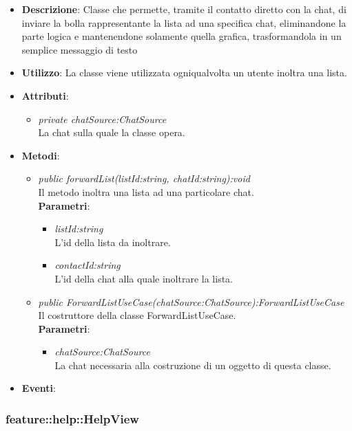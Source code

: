 \begin{itemize}
\item \textbf{Descrizione}: Classe che permette, tramite il contatto diretto con la chat, di inviare la bolla rappresentante la lista ad una specifica chat, eliminandone la parte logica e mantenendone solamente quella grafica, trasformandola in un semplice messaggio di testo
\item \textbf{Utilizzo}: La classe viene utilizzata ogniqualvolta un utente inoltra una lista.
\item \textbf{Attributi}: 
	\begin{itemize}
	\item \textit{private chatSource:ChatSource}\\
	La chat sulla quale la classe opera.
	\end{itemize}
\item \textbf{Metodi}:
	\begin{itemize}
	\item \textit{public forwardList(listId:string, chatId:string):void}\\
	Il metodo inoltra una lista ad una particolare chat.
			\\ \textbf{Parametri}: \begin{itemize}
			\item \textit{listId:string}\\
			L'id della lista da inoltrare.
			\item \textit{contactId:string}\\
			L'id della chat alla quale inoltrare la lista.
			\end{itemize} 
	\item \textit{public ForwardListUseCase(chatSource:ChatSource):ForwardListUseCase}\\
	Il costruttore della classe ForwardListUseCase.
			\\ \textbf{Parametri}: \begin{itemize}
			\item \textit{chatSource:ChatSource}\\
			La chat necessaria alla costruzione di un oggetto di questa classe.
			\end{itemize} 
	\end{itemize}
\item \textbf{Eventi}:
\end{itemize}

\subsubsection{feature::help::HelpView}

